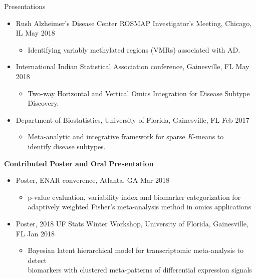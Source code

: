 \documentclass{resume} %
\begin{document}
\begin{rSection}{Presentations}
\begin{itemize}[noitemsep,topsep=0pt]
\item  Rush Alzheimer's Disease Center ROSMAP Investigator's Meeting, Chicago, IL  \hfill {May 2018}
\begin{itemize}[noitemsep,topsep=0pt]
\item{Identifying variably methylated regions (VMRs) associated with AD.}
\end{itemize}

\item  International Indian Statistical Association conference, Gainesville, FL \hfill {May 2018}
\begin{itemize}[noitemsep,topsep=0pt]
\item{Two-way Horizontal and Vertical Omics Integration for Disease Subtype Discovery.}
\end{itemize}

\item  Department of Biostatistics, University of Florida, Gainesville, FL \hfill {Feb 2017}
\begin{itemize}[noitemsep,topsep=0pt]
\item{Meta-analytic and integrative framework for sparse $K$-means to\\ identify disease subtypes.}
\end{itemize}


\end{itemize}


\textbf{Contributed Poster and Oral Presentation}

\begin{itemize}[noitemsep,topsep=0pt]


\item  Poster, ENAR converence, Atlanta, GA \hfill {Mar 2018}
\begin{itemize}[noitemsep,topsep=0pt]
\item{p-value evaluation, variability index and biomarker categorization for \\adaptively
weighted Fisher's meta-analysis method in omics applications}
\end{itemize}


\item  Poster, 2018 UF Stats Winter Workshop, University of Florida, Gainesville, FL \hfill {Jan 2018}
\begin{itemize}[noitemsep,topsep=0pt]
\item{Bayesian latent hierarchical model for transcriptomic meta-analysis to detect\\ biomarkers with clustered meta-patterns of differential expression signals}
\end{itemize}


\end{itemize}
\end{rSection}
\end{document}
